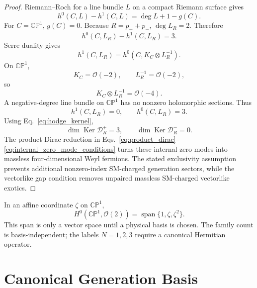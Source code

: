 \documentclass[aps,prd,preprint,notitlepage,nofootinbib,superscriptaddress,floatfix]{revtex4-2}
\newcommand{\Span}{\operatorname{span}}
\newcommand{\Ker}{\operatorname{Ker}}
\newcommand{\cO}{\mathcal O}
\newcommand{\CP}{\mathbb{CP}}
\newcommand{\scrD}{\mathscr D}
\theoremstyle{remark}
\begin{document}
\begin{proof}
Riemann--Roch for a line bundle \(L\) on a compact Riemann surface gives \cite{Hartshorne1977,GriffithsHarris1978,Forster1981}
\begin{equation}
h^0(C,L)-h^1(C,L)=\deg L+1-g(C).
\end{equation}
For \(C=\CP^1\), \(g(C)=0\).
Because \(R=p_+ + p_-\), \(\deg L_R=2\).
Therefore
\begin{equation}
h^0(C,L_R)-h^1(C,L_R)=3.
\label{eq:rr_index}
\end{equation}
Serre duality gives
\begin{equation}
h^1(C,L_R)
=
h^0(C,K_C\otimes L_R^{-1}).
\end{equation}
On \(\CP^1\),
\begin{equation}
K_C=\cO(-2),
\qquad
L_R^{-1}=\cO(-2),
\end{equation}
so
\begin{equation}
K_C\otimes L_R^{-1}=\cO(-4).
\end{equation}
A negative-degree line bundle on \(\CP^1\) has no nonzero holomorphic sections.
Thus
\begin{equation}
h^1(C,L_R)=0,
\qquad
h^0(C,L_R)=3.
\end{equation}
Using Eq.~\eqref{eq:hodge_kernel},
\begin{equation}
\dim\Ker\scrD_R^+=3,
\qquad
\dim\Ker\scrD_R^-=0.
\end{equation}
The product Dirac reduction in Eqs.~\eqref{eq:product_dirac}--\eqref{eq:internal_zero_mode_conditions} turns these internal zero modes into massless four-dimensional Weyl fermions.
The stated exclusivity assumption prevents additional nonzero-index SM-charged generation sectors, while the vectorlike gap condition removes unpaired massless SM-charged vectorlike exotics.
\end{proof}

In an affine coordinate \(\zeta\) on \(\CP^1\),
\begin{equation}
H^0(\CP^1,\cO(2))
=
\Span\{1,\zeta,\zeta^2\}.
\label{eq:holomorphic_basis}
\end{equation}
This span is only a vector space until a physical basis is chosen.
The family count is basis-independent; the labels \(N=1,2,3\) require a canonical Hermitian operator.

\section{Canonical Generation Basis}
\label{sec:canonical_basis}
\end{document}
